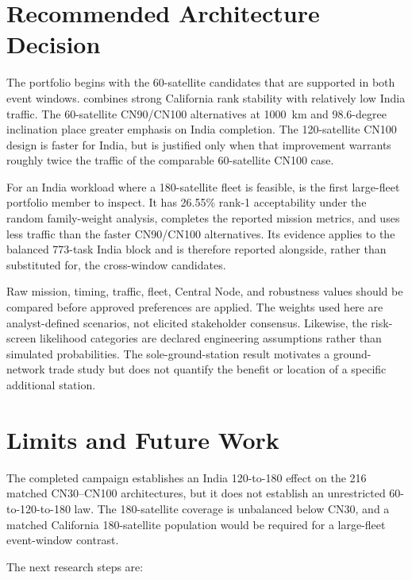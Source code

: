 \section{Recommended Architecture Decision}

The portfolio begins with the 60-satellite candidates that are supported in both event windows.  combines strong California rank stability with relatively low India traffic. The 60-satellite CN90/CN100 alternatives at 1000~km and 98.6-degree inclination place greater emphasis on India completion. The 120-satellite CN100 design is faster for India, but is justified only when that improvement warrants roughly twice the traffic of the comparable 60-satellite CN100 case.

For an India workload where a 180-satellite fleet is feasible,  is the first large-fleet portfolio member to inspect. It has 26.55\% rank-1 acceptability under the random family-weight analysis, completes the reported mission metrics, and uses less traffic than the faster CN90/CN100 alternatives. Its evidence applies to the balanced 773-task India block and is therefore reported alongside, rather than substituted for, the cross-window candidates.

Raw mission, timing, traffic, fleet, Central Node, and robustness values should be compared before approved preferences are applied. The weights used here are analyst-defined scenarios, not elicited stakeholder consensus. Likewise, the risk-screen likelihood categories are declared engineering assumptions rather than simulated probabilities. The sole-ground-station result motivates a ground-network trade study but does not quantify the benefit or location of a specific additional station.

\section{Limits and Future Work}

The completed campaign establishes an India 120-to-180 effect on the 216 matched CN30--CN100 architectures, but it does not establish an unrestricted 60-to-120-to-180 law. The 180-satellite coverage is unbalanced below CN30, and a matched California 180-satellite population would be required for a large-fleet event-window contrast.

The next research steps are:

